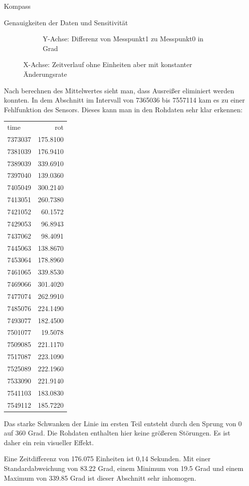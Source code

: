 \documentclass[12pt]{report}
\begin{document}
\begin{section}{Kompass}
\begin{subsection}{Genauigkeiten der Daten und Sensitivität}
\begin{figure}[h!]
\begin{subfigure}{0.45\linewidth}
      \caption{Y-Achse: Differenz von Messpunkt1 zu Messpunkt0 in Grad}
    \end{subfigure}
    \caption{X-Achse: Zeitverlauf ohne Einheiten aber mit konstanter Änderungsrate}
  \end{figure}

  Nach berechnen des Mittelwertes sieht man, dass Ausreißer eliminiert werden
  konnten. In dem Abschnitt im Intervall von 7365036 bis 7557114 kam es zu
  einer Fehlfunktion des Sensors. Dieses kann man in den Rohdaten sehr klar erkennen:
  \begin{tabular}{lr}
     time &       rot \\
    7373037 &  175.8100 \\
    7381039 &  176.9410 \\
    7389039 &  339.6910 \\
    7397040 &  139.0360 \\
    7405049 &  300.2140 \\
    7413051 &  260.7380 \\
    7421052 &   60.1572 \\
    7429053 &   96.8943 \\
    7437062 &   98.4091 \\
    7445063 &  138.8670 \\
    7453064 &  178.8960 \\
    7461065 &  339.8530 \\
    7469066 &  301.4020 \\
    7477074 &  262.9910 \\
    7485076 &  224.1490 \\
    7493077 &  182.4500 \\
    7501077 &   19.5078 \\
    7509085 &  221.1170 \\
    7517087 &  223.1090 \\
    7525089 &  222.1960 \\
    7533090 &  221.9140 \\
    7541103 &  183.0830 \\
    7549112 &  185.7220 \\
  \end{tabular}

  Das starke Schwanken der Linie im ersten Teil entsteht durch den Sprung
  von 0 auf 360 Grad. Die Rohdaten enthalten hier keine größeren Störungen. Es
  ist daher ein rein visueller Effekt.

  Eine Zeitdifferenz von 176.075 Einheiten ist 0,14 Sekunden.
  Mit einer Standardabweichung von 83.22 Grad, einem Minimum von 19.5 Grad und
  einem Maximum von 339.85 Grad ist dieser Abschnitt sehr inhomogen.


\end{subsection}
\end{section}
\end{document}
